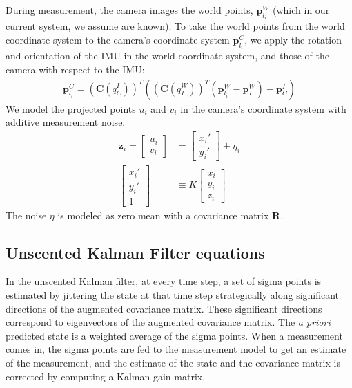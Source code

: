 \documentclass[letterpaper]{article}
\newcommand{\bb}[1]{\mathbf{#1}}
\begin{document}
During measurement, the camera images the world points,
$\bb{p}_{l_i}^W$ (which in our current system, we assume are
known). To take the world points from the world coordinate system to
the camera's coordinate system $\bb{p}_{l_i}^C$, we apply the rotation
and orientation of the IMU in the world coordinate system, and those
of the camera with respect to the IMU:
\begin{align}
\bb{p}_{l_i}^C=(\bb{C}(\overline{q}_C^I))^T \left((\bb{C}(\overline{q}_I^W))^T \left(\bb{p}_{l_i}^W-\bb{p}_I^W\right) -\bb{p}_C^I \right)
\end{align}
We model the projected points $u_i$ and $v_i$ in the camera's coordinate system with additive measurement noise. 
\begin{align}
\bb{z}_i=\begin{bmatrix} u_i \\ v_i \end{bmatrix}&=\begin{bmatrix} x_i' \\ y_i' \end{bmatrix}+\eta_i \\
\begin{bmatrix} x_i' \\ y_i' \\ 1 \end{bmatrix} & \equiv K\begin{bmatrix} x_i \\ y_i  \\ z_i \end{bmatrix} \nonumber
\end{align}
The noise $\eta$ is modeled as zero mean with a covariance matrix $\bb{R}$.

\subsection{Unscented Kalman Filter equations}

In the unscented Kalman filter, at every time step, a set of sigma
points is estimated by jittering the state at that time step
strategically along significant directions of the augmented covariance
matrix. These significant directions correspond to eigenvectors of the
augmented covariance matrix. The \emph{a priori} predicted state is a
weighted average of the sigma points. When a measurement comes in, the
sigma points are fed to the measurement model to get an estimate of
the measurement, and the estimate of the state and the covariance
matrix is corrected by computing a Kalman gain matrix.
\end{document}
